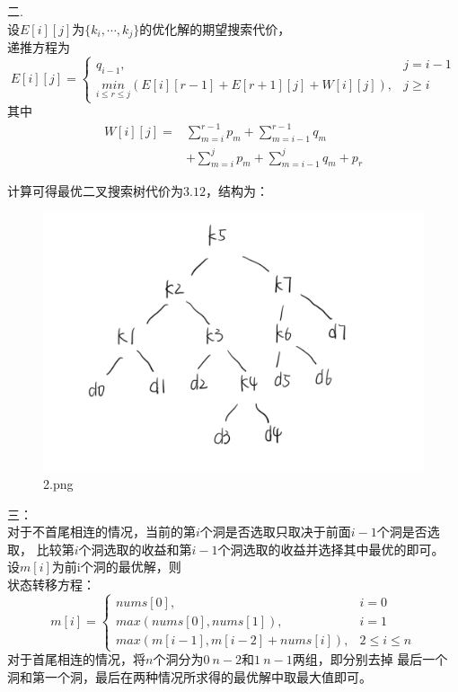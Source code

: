 \documentclass{article}
\begin{document}
\newpage
二.\\
设$E[i][j]$为$\{ k_i, \cdots, k_j\}$的优化解的期望搜索代价，\\
递推方程为
\[
E[i][j] = 
\begin{cases}
    q_{i - 1}, & j = i - 1 \\
    \underset{i \leq r \leq j}{min}(E[i][r -1] + E[r + 1][j] + W[i][j]), & j \geq i 
\end{cases}
\]
其中
\[
\begin{split}
W[i][j] = & \sum\limits_{m = i}^{r - 1}p_m + \sum\limits_{m = i - 1}^{r - 1}q_m \\
          & + \sum\limits_{m = i}^{j}p_m + \sum\limits_{m = i - 1}^{j}q_m + p_r
\end{split}
\]

计算可得最优二叉搜索树代价为$3.12$，结构为：
\begin{figure}[htbp]
    \centering
    \includegraphics[width=1\textwidth, height=0.8\textwidth]{2.png}
    \caption{2.png}
    \end{figure} 
\newpage
三：\\
对于不首尾相连的情况，当前的第$i$个洞是否选取只取决于前面$i - 1$个洞是否选取，
比较第$i$个洞选取的收益和第$i - 1$个洞选取的收益并选择其中最优的即可。
设$m[i]$为前i个洞的最优解，则 \\
状态转移方程：
\[
m[i] = 
\begin{cases}
    nums[0], & i = 0 \\
    max(nums[0], nums[1]), & i = 1 \\
    max(m[i - 1], m[i - 2] + nums[i]), & 2 \leq i \leq n
\end{cases}
\]
对于首尾相连的情况，将$n$个洞分为$0~n-2$和$1~n-1$两组，即分别去掉
最后一个洞和第一个洞，最后在两种情况所求得的最优解中取最大值即可。
\end{document}

